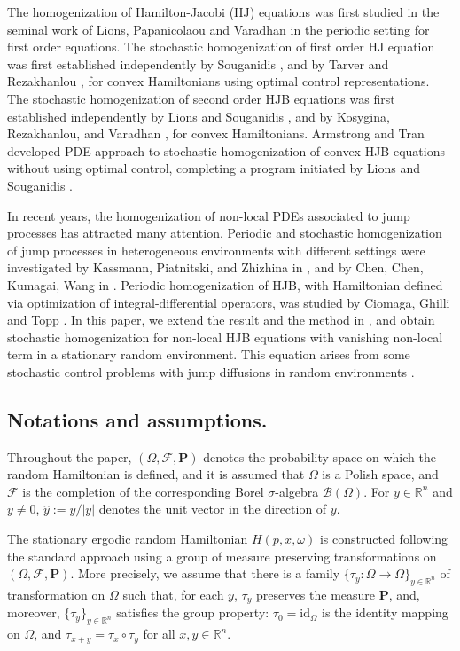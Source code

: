 \documentclass[11pt,reqno]{amsart}
\theoremstyle{definition}
\theoremstyle{remark}
\numberwithin{equation}{section}
\newcommand{\R}{{\mathbb{R}}}
\begin{document}
The homogenization of Hamilton-Jacobi (HJ) equations was first studied in the seminal work of Lions, Papanicolaou and Varadhan \cite{LPV1987} in the periodic setting for first order equations. The stochastic homogenization of first order HJ equation was first established independently by Souganidis \cite{MR1697831}, and by Tarver and Rezakhanlou \cite{MR1756906}, for convex Hamiltonians using optimal control representations. The stochastic homogenization of second order HJB equations was first established independently by Lions and Souganidis \cite{LS05}, and by Kosygina, Rezakhanlou, and Varadhan \cite{KRV06}, for convex Hamiltonians. Armstrong and Tran \cite{AT15} developed PDE approach to stochastic homogenization of convex HJB equations without using optimal control, completing a program initiated by Lions and Souganidis \cite{MR2664465}. 

In recent years, the homogenization of non-local PDEs associated to jump processes has attracted many attention.  Periodic and stochastic homogenization of jump processes in heterogeneous environments with different settings were investigated by Kassmann, Piatnitski, and Zhizhina in \cite{KPZ19}, and by Chen, Chen, Kumagai, Wang in \cite{CCKW21, CCKW21R}. Periodic homogenization of HJB, with Hamiltonian defined via optimization of integral-differential operators, was studied by Ciomaga, Ghilli and Topp \cite{MR4373878}.
In this paper, we extend the result and the method in \cite{KRV06}, and obtain stochastic homogenization for non-local HJB equations with vanishing non-local term in a stationary random environment. This equation arises from some stochastic control problems with jump diffusions in random environments \cite{OS07, HP98}.

\subsection*{Notations and assumptions.} Throughout the paper, $(\Omega, \mathscr{F},\mathbf{P})$ denotes the probability space on which the random Hamiltonian is defined, and it is assumed that $\Omega$ is a Polish space, and $\mathscr{F}$ is the completion of the corresponding Borel $\sigma$-algebra $\mathcal{B}(\Omega)$. For $y\in \R^n$ and $y\ne 0$, $\hat{y} := y/|y|$ denotes the unit vector in the direction of $y$.

The stationary ergodic random Hamiltonian $H(p,x,\omega)$ is constructed following the standard approach using a group of measure preserving transformations on $(\Omega, \mathscr{F},\mathbf{P})$. More precisely, we assume that there is a family $\{\tau_{y}:\Omega\rightarrow \Omega\}_{y\in\mathbb{R}^n}$ of transformation on $\Omega$ such that, for each $y$, $\tau_y$ preserves the measure $\mathbf{P}$, and, moreover, $\{\tau_y\}_{y\in \R^n}$ satisfies the group property: $\tau_0 = \mathrm{id}_\Omega$ is the identity mapping on $\Omega$, and $\tau_{x+y}=\tau_x\circ \tau_y$ for all $x,y \in \R^n$. 
\end{document}
